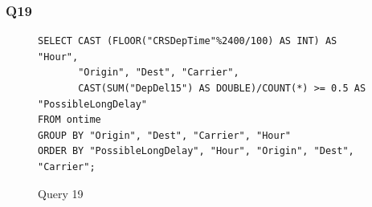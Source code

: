 \begin{figure}[t!]
\end{figure}

\subsubsection{Q19}

\begin{figure}[t]
\begin{lstlisting}[frame=single]
SELECT CAST (FLOOR("CRSDepTime"%2400/100) AS INT) AS "Hour",
       "Origin", "Dest", "Carrier",
       CAST(SUM("DepDel15") AS DOUBLE)/COUNT(*) >= 0.5 AS "PossibleLongDelay"
FROM ontime
GROUP BY "Origin", "Dest", "Carrier", "Hour"
ORDER BY "PossibleLongDelay", "Hour", "Origin", "Dest", "Carrier";
\end{lstlisting}
  \caption{Query 19}
  \label{sel:sql19}
\end{figure}


